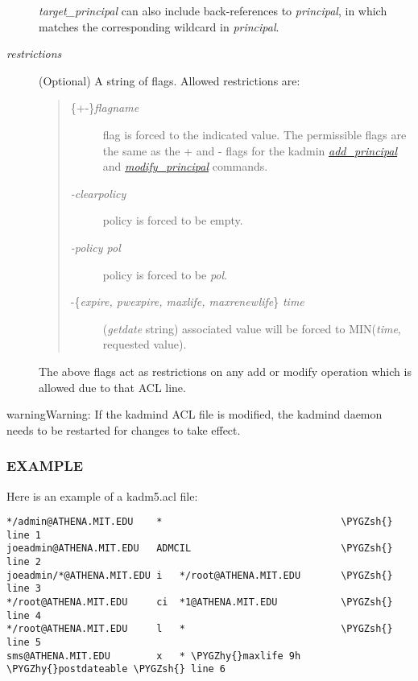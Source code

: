 \documentclass[letterpaper,10pt,english]{sphinxmanual}
\def\PYGZsh{\char`\#}
\def\PYGZhy{\char`\-}
\begin{document}
\begin{description}
\emph{target\_principal} can also include back-references to \emph{principal},
in which  matches the corresponding wildcard in
\emph{principal}.

\item[{\emph{restrictions}}] \leavevmode
(Optional) A string of flags. Allowed restrictions are:
\begin{quote}
\begin{description}
\item[{\{+\textbar{}-\}\emph{flagname}}] \leavevmode
flag is forced to the indicated value.  The permissible flags
are the same as the + and - flags for the kadmin
{\hyperref[admin/admin_commands/kadmin_local:add-principal]{\emph{add\_principal}}} and {\hyperref[admin/admin_commands/kadmin_local:modify-principal]{\emph{modify\_principal}}} commands.

\item[{\emph{-clearpolicy}}] \leavevmode
policy is forced to be empty.

\item[{\emph{-policy pol}}] \leavevmode
policy is forced to be \emph{pol}.

\item[{-\{\emph{expire, pwexpire, maxlife, maxrenewlife}\} \emph{time}}] \leavevmode
(\emph{getdate} string) associated value will be forced to
MIN(\emph{time}, requested value).

\end{description}
\end{quote}

The above flags act as restrictions on any add or modify operation
which is allowed due to that ACL line.

\end{description}

\begin{notice}{warning}{Warning:}
If the kadmind ACL file is modified, the kadmind daemon needs to be
restarted for changes to take effect.
\end{notice}


\subsubsection{EXAMPLE}
\label{admin/conf_files/kadm5_acl:example}
Here is an example of a kadm5.acl file:

\begin{Verbatim}[commandchars=\\\{\}]
*/admin@ATHENA.MIT.EDU    *                               \PYGZsh{} line 1
joeadmin@ATHENA.MIT.EDU   ADMCIL                          \PYGZsh{} line 2
joeadmin/*@ATHENA.MIT.EDU i   */root@ATHENA.MIT.EDU       \PYGZsh{} line 3
*/root@ATHENA.MIT.EDU     ci  *1@ATHENA.MIT.EDU           \PYGZsh{} line 4
*/root@ATHENA.MIT.EDU     l   *                           \PYGZsh{} line 5
sms@ATHENA.MIT.EDU        x   * \PYGZhy{}maxlife 9h \PYGZhy{}postdateable \PYGZsh{} line 6
\end{Verbatim}
\end{document}
